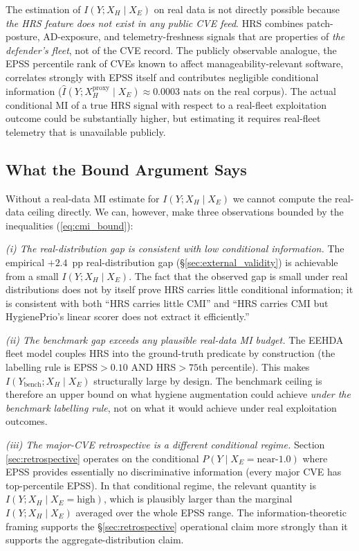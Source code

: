 The estimation of $I(Y; X_H \mid X_E)$ on real data is not directly
possible because \emph{the HRS feature does not exist in any public
CVE feed}. HRS combines patch-posture, AD-exposure, and
telemetry-freshness signals that are properties of \emph{the
defender's fleet}, not of the CVE record. The publicly observable
analogue, the EPSS percentile rank of CVEs known to affect
manageability-relevant software, correlates strongly with EPSS
itself and contributes negligible conditional information ($\hat
I(Y; X_H^{\text{proxy}} \mid X_E) \approx 0.0003$ nats on the real
corpus). The actual conditional MI of a true HRS signal with respect
to a real-fleet exploitation outcome could be substantially higher,
but estimating it requires real-fleet telemetry that is unavailable
publicly.

\subsection{What the Bound Argument Says}

Without a real-data MI estimate for $I(Y; X_H \mid X_E)$ we cannot
compute the real-data ceiling directly. We can, however, make three
observations bounded by the inequalities (\ref{eq:cmi_bound}):

\textit{(i) The real-distribution gap is consistent with low
conditional information.} The empirical $+2.4$~pp real-distribution
gap (\S\ref{sec:external_validity}) is achievable from a small
$I(Y; X_H \mid X_E)$. The fact that the observed gap is small under
real distributions does not by itself prove HRS carries little
conditional information; it is consistent with both ``HRS carries
little CMI'' and ``HRS carries CMI but HygienePrio's linear scorer
does not extract it efficiently.''

\textit{(ii) The benchmark gap exceeds any plausible real-data MI
budget.} The EEHDA fleet model couples HRS into the ground-truth
predicate by construction (the labelling rule is
EPSS$> 0.10$ AND HRS$> 75$th percentile). This makes
$I(Y_{\text{bench}}; X_H \mid X_E)$ structurally large by design.
The benchmark ceiling is therefore an upper bound on what hygiene
augmentation could achieve \emph{under the benchmark labelling rule},
not on what it would achieve under real exploitation outcomes.

\textit{(iii) The major-CVE retrospective is a different conditional
regime.} Section \ref{sec:retrospective} operates on the conditional
$P(Y \mid X_E = \text{near-1.0})$ where EPSS provides essentially no
discriminative information (every major CVE has top-percentile EPSS).
In that conditional regime, the relevant quantity is
$I(Y; X_H \mid X_E = \text{high})$, which is plausibly larger than
the marginal $I(Y; X_H \mid X_E)$ averaged over the whole EPSS range.
The information-theoretic framing supports the
\S\ref{sec:retrospective} operational claim more strongly than it
supports the aggregate-distribution claim.

